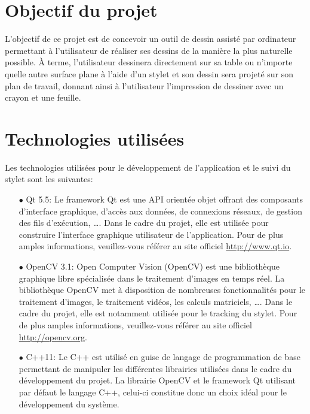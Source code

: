 \documentclass[11pt,a4paper,oldfontcommands]{memoir}
\begin{document}
\newpage

\section{Objectif du projet}

L'objectif de ce projet est de concevoir un outil de dessin assisté par ordinateur permettant à l'utilisateur de réaliser ses dessins de la manière la plus naturelle possible. À terme, l'utilisateur dessinera directement sur sa table ou n'importe quelle autre surface plane à l'aide d'un stylet et son dessin sera projeté sur son plan de travail, donnant ainsi à l'utilisateur l'impression de dessiner avec un crayon et une feuille.

\section{Technologies utilisées}

Les technologies utilisées pour le développement de l'application et le suivi du stylet sont les suivantes:

\begin{itemize}
\item[$\bullet$] Qt 5.5: Le framework Qt est une API orientée objet offrant des composants d'interface graphique, d'accès aux données, de connexions réseaux, de gestion des fils d'exécution, \dots. Dans le cadre du projet, elle est utilisée pour construire l'interface graphique utilisateur de l'application. Pour de plus amples informations, veuillez-vous référer au site officiel \url{http://www.qt.io}.
\item[$\bullet$] OpenCV 3.1: Open Computer Vision (OpenCV) est une bibliothèque graphique libre spécialisée dans le traitement d'images en temps réel. La bibliothèque OpenCV met à disposition de nombreuses fonctionnalités pour le traitement d'images, le traitement vidéos, les calculs matriciels, \dots. Dans le cadre du projet, elle est notamment utilisée pour le tracking du stylet. Pour de plus amples informations, veuillez-vous référer au site officiel \url{http://opencv.org}.
\item[$\bullet$] C++11: Le C++ est utilisé en guise de langage de programmation de base permettant de manipuler les différentes librairies utilisées dans le cadre du développement du projet. La librairie OpenCV et le framework Qt utilisant par défaut le langage C++, celui-ci constitue donc un choix idéal pour le développement du système.
\end{itemize}
\end{document}
